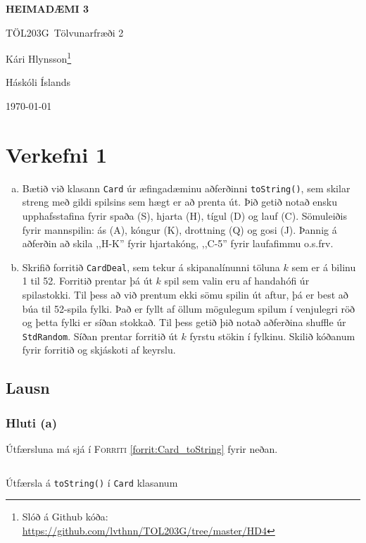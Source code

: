 \documentclass[12pt, a4paper, hidelinks]{article}
\title{}
\newcommand{\doctitle}{\uppercase{Heimadæmi 3}}
\newcommand{\coursename}{Tölvunarfræði 2}
\newcommand{\coursenum}{TÖL203G}
\begin{document}
\thispagestyle{plain}
\centerline{\bfseries\Large\doctitle}
\medskip
\centerline{\large\coursenum\ \coursename}
\bigskip

\centerline{\large Kári Hlynsson\footnote{Slóð á Github kóða: \url{https://github.com/lvthnn/TOL203G/tree/master/HD4}}}
\bigskip
\centerline{Háskóli Íslands}
\medskip
\centerline{\today}


\section*{Verkefni 1}

\begin{enumerate}[(a)]
    \item Bætið við klasann \texttt{Card} úr æfingadæminu aðferðinni \texttt{toString()}, sem skilar
    streng með gildi spilsins sem hægt er að prenta út. Þið getið notað ensku upphafsstafina fyrir spaða
    (S), hjarta (H), tígul (D) og lauf (C). Sömuleiðis fyrir mannspilin: ás (A), kóngur (K), drottning (Q)
    og gosi (J). Þannig á aðferðin að skila ,,H-K'' fyrir hjartakóng, ,,C-5'' fyrir laufafimmu o.s.frv.

    \item Skrifið forritið \texttt{CardDeal}, sem tekur á skipanalínunni töluna $k$ sem er á bilinu 1 til 52.
    Forritið prentar þá út $k$ spil sem valin eru af handahófi úr spilastokki. Til þess að við prentum ekki sömu
    spilin út aftur, þá er best að búa til 52-spila fylki. Það er fyllt af öllum mögulegum spilum í venjulegri röð
    og þetta fylki er síðan stokkað. Til þess getið þið notað aðferðina shuffle úr \texttt{StdRandom}. Síðan prentar
    forritið út $k$ fyrstu stökin í fylkinu. Skilið kóðanum fyrir forritið og skjáskoti af keyrslu.
\end{enumerate}

\subsection*{Lausn}
\subsubsection*{Hluti (a)}
Útfærsluna má sjá í \textsc{Forriti} \ref{forrit:Card_toString} fyrir neðan.

\begin{listing}[H]
    \centering
    \inputminted[linenos, frame=single, fontsize=\footnotesize, firstline=21, lastline=26]{java}{../src/V1/Card.java}
    \caption{Útfærsla á \texttt{toString()} í \texttt{Card} klasanum}
    \label{forrit:Card_toString}
\end{listing}
\end{document}

